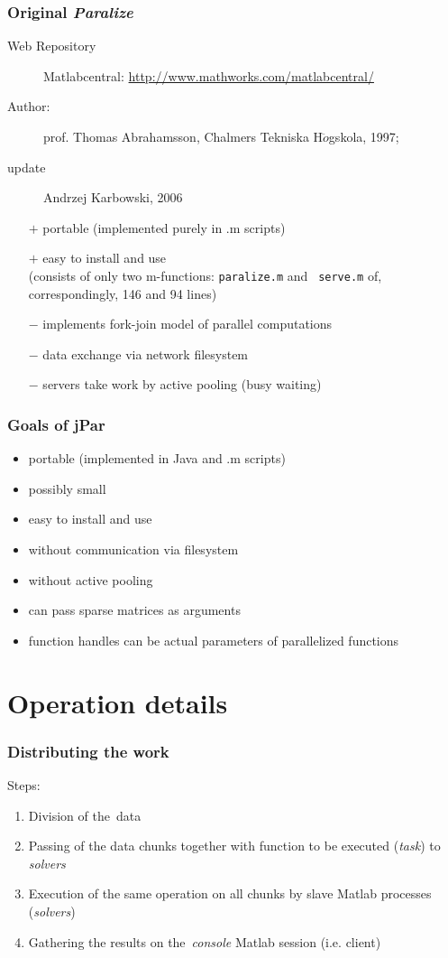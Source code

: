 \documentclass{beamer}
\begin{document}
\begin{frame}
\frametitle{Original \emph{Paralize}}
\begin{description}
 \item[Web Repository] Matlabcentral:
\url{http://www.mathworks.com/matlabcentral/}

\item[Author:] prof. Thomas Abrahamsson, Chalmers
Tekniska H$\ddot{o}$gskola, 1997;\\
\item[update]
Andrzej Karbowski, 2006\\
\end{description}
\begin{itemize}
\item [$+$] portable (implemented purely in .m scripts)
\item [$+$] easy to install and use\\
(consists of only two m-functions: {\tt paralize.m} and {\tt
serve.m} of, correspondingly, 146 and 94 lines)
\item [$-$] implements fork-join  model of parallel
computations
\item [$-$] data exchange via network filesystem
\item [$-$] servers take work by active pooling (busy waiting)
\end{itemize}
\end{frame}

\begin{frame}
\frametitle{Goals of jPar}
\begin{itemize}
\item portable (implemented in Java and .m scripts)
\item possibly small
\item easy to install and use
\item without communication via filesystem
\item without active pooling
\item can pass sparse matrices as arguments
\item function handles can be actual parameters
of parallelized functions
\end{itemize}
\end{frame}


\section{Operation details}

\begin{frame}
\frametitle{Distributing the work}
Steps:
\begin{enumerate}
\item Division of the~data
\item Passing of the data chunks together with function
      to be executed (\emph{task}) to \emph{solvers}
\item Execution of the same operation on all chunks  by slave Matlab processes (\emph{solvers})
\item Gathering the results on the~\emph{console} Matlab session (i.e. client)
\end{enumerate}
\end{frame}
\end{document}
